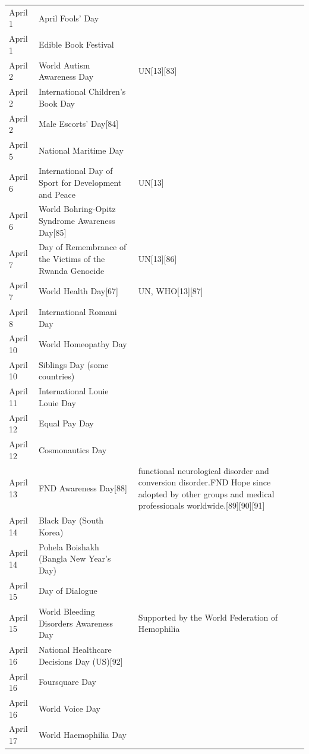 \documentclass[
  openany]{book}
\begin{document}
\begin{longtable}[t]{>{\raggedright\arraybackslash}p{8em}>{\raggedright\arraybackslash}p{20em}>{\raggedright\arraybackslash}p{12em}}
\rowcolor{gray!6}  April 1 & April Fools' Day & \\
\addlinespace
April 1 & Edible Book Festival & \\
\rowcolor{gray!6}  April 2 & World Autism Awareness Day & UN[13][83]\\
April 2 & International Children's Book Day & \\
\rowcolor{gray!6}  April 2 & Male Escorts' Day[84] & \\
April 5 & National Maritime Day & \\
\addlinespace
\rowcolor{gray!6}  April 6 & International Day of Sport for Development and Peace & UN[13]\\
April 6 & World Bohring-Opitz Syndrome Awareness Day[85] & \\
\rowcolor{gray!6}  April 7 & Day of Remembrance of the Victims of the Rwanda Genocide & UN[13][86]\\
April 7 & World Health Day[67] & UN, WHO[13][87]\\
\rowcolor{gray!6}  April 8 & International Romani Day & \\
\addlinespace
April 10 & World Homeopathy Day & \\
\rowcolor{gray!6}  April 10 & Siblings Day (some countries) & \\
April 11 & International Louie Louie Day & \\
\rowcolor{gray!6}  April 12 & Equal Pay Day & \\
April 12 & Cosmonautics Day & \\
\addlinespace
\rowcolor{gray!6}  April 13 & FND Awareness Day[88] & functional neurological disorder and conversion disorder.FND Hope since adopted by other groups and medical professionals worldwide.[89][90][91]\\
April 14 & Black Day (South Korea) & \\
\rowcolor{gray!6}  April 14 & Pohela Boishakh (Bangla New Year's Day) & \\
April 15 & Day of Dialogue & \\
\rowcolor{gray!6}  April 15 & World Bleeding Disorders Awareness Day & Supported by the World Federation of Hemophilia\\
\addlinespace
April 16 & National Healthcare Decisions Day (US)[92] & \\
\rowcolor{gray!6}  April 16 & Foursquare Day & \\
April 16 & World Voice Day & \\
\rowcolor{gray!6}  April 17 & World Haemophilia Day & \\

\end{longtable}
\end{document}

